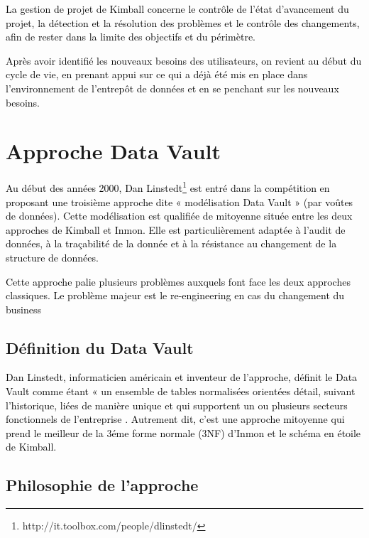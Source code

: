 \documentclass[a4paper,12pt]{report}
\begin{document}
\textcolor{black}{La gestion de projet de Kimball concerne le contrôle de l’état d’avancement du projet, la détection et la résolution des problèmes et le contrôle des changements, afin de rester dans la limite des objectifs et du périmètre.}





\textcolor{black}{Après avoir identifié les nouveaux besoins des utilisateurs, on revient au début du cycle de vie, en prenant appui sur ce qui a déjà été mis en place dans l’environnement de l’entrepôt de données et en se penchant sur les nouveaux besoins. }


\section{Approche Data Vault}

\textcolor{black}{Au début des années 2000, Dan Linstedt\footnote{http://it.toolbox.com/people/dlinstedt/}  est entré dans la compétition en proposant une troisième approche dite « modélisation Data Vault » (par voûtes de données). Cette modélisation est qualifiée de mitoyenne située entre les deux approches de Kimball et Inmon. Elle est particulièrement adaptée à l'audit de données, à la traçabilité de la donnée et à la résistance au changement de la structure de données.}

\textcolor{black}{Cette approche palie plusieurs problèmes auxquels font face les deux approches classiques. Le problème majeur est le re-engineering en cas du changement du business}

\subsection{Définition du Data Vault}

\textcolor{black}{Dan Linstedt, informaticien américain et inventeur de l’approche, définit le Data Vault comme étant « un ensemble de tables normalisées orientées détail, suivant l’historique, liées de manière unique et qui supportent un ou plusieurs secteurs fonctionnels de l’entreprise \citep{3}. Autrement dit, c’est une approche mitoyenne qui prend le meilleur de la 3éme  forme normale (3NF) d’Inmon et le schéma en étoile de Kimball.}

\subsection{Philosophie de l’approche}
\end{document}
